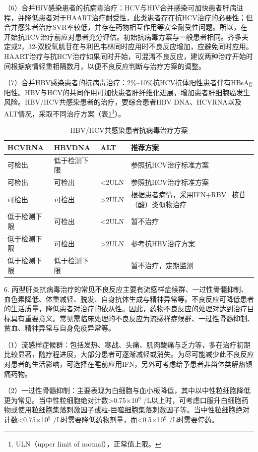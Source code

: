（6）合并HIV感染患者的抗病毒治疗：HCV与HIV合并感染可加快患者肝病进程，并降低患者对于HAART治疗耐受性，此类患者存在抗HCV治疗的必要性；但合并感染者治疗SVR率较低，并存在药物相互作用等安全耐受性问题。所以，在开始抗HCV治疗前应对患者充分评估。初始抗病毒方案与一般患者相同。齐多夫定或2，32-双脱氧肌苷在与利巴韦林同时应用时不良反应增加，应避免同时应用。HAART治疗与抗HCV治疗如果同时开始，可混淆不良反应，建议两种治疗开始时间根据病情轻重相隔数月，以便不良反应判断与治疗方案的调整。

（7）合并HBV感染患者的抗病毒治疗：2\%\textasciitilde{}10\%抗HCV抗体阳性患者伴有HBsAg阳性。HBV与HCV的共同作用可加快患者肝纤维化进展，增加患者肝细胞癌发生风险。HBV/HCV共感染患者的治疗，要综合患者HBV
DNA、HCVRNA以及ALT情况，采取不同治疗方案（表\ref{tab3-10-7}\footnote{ULN（upper limit of normal），正常值上限。}）。

\begin{table}[htbp]
    \centering
    \caption{HBV/HCV共感染患者抗病毒治疗方案}
    \label{tab3-10-7}
    \begin{tabular}{llll}
\toprule
HCVRNA & HBVDNA & ALT & 推荐方案\tabularnewline
\midrule
可检出 & 低于检测下限 & & 参照抗HCV治疗标准方案\tabularnewline
可检出 & 可检出 & \textless{}2ULN & 参照抗HCV治疗标准方案\tabularnewline
可检出 & 可检出 & \textgreater{}2ULN &
根据患者病情，采用IFN+RBV±核苷（酸）类似物治疗\tabularnewline
低于检测下限 & 可检出 & \textless{}2ULN & 暂不治疗\tabularnewline
低于检测下限 & 可检出 & \textgreater{}2ULN &
参考抗HBV治疗方案\tabularnewline
低于检测下限 & 低于检测下限 & & 暂不治疗，定期监测\tabularnewline
\bottomrule
    \end{tabular}
\end{table}

6.
丙型肝炎抗病毒治疗的常见不良反应主要有流感样症候群、一过性骨髓抑制、血色素降低、体重减轻、脱发、自身抗体生成与精神异常等。不良反应可降低患者的生活质量，降低患者对治疗的依从性。因此，药物不良反应的处理对达到治疗目标具有重要意义。常见需临床处理的不良反应为流感样症候群、一过性骨髓抑制、贫血、精神异常与自身免疫异常等。

（1）流感样症候群：包括发热、寒战、头痛、肌肉酸痛与乏力等，多在治疗初期比较显著，随疗程进展，大部分患者可逐渐减轻或消失。为尽可能减少此不良反应对患者的生活影响，可选择在睡前应用IFN，另外可考虑给予患者非甾体类解热镇痛药物。

（2）一过性骨髓抑制：主要表现为白细胞与血小板降低，其中以中性粒细胞降低更为常见。当中性粒细胞绝对计数\textgreater{}0.75×10$^{9}$
/L以上时，可考虑口服升白细胞药物或使用粒细胞集落刺激因子或粒-巨噬细胞集落刺激因子等。当中性粒细胞绝对计数\textless{}0.75×10$^{9}$
/L时需要降低药物剂量，而\textless{}0.5×10$^{9}$ /L时需要停药。

